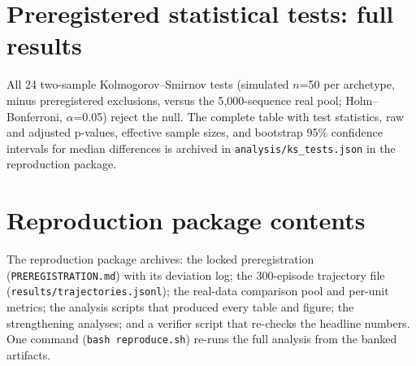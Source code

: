 \documentclass[12pt,a4paper]{article}
\begin{document}
\appendix

\section{Preregistered statistical tests: full results}

All 24 two-sample Kolmogorov--Smirnov tests (simulated $n$=50 per archetype,
minus preregistered exclusions, versus the 5{,}000-sequence real pool;
Holm--Bonferroni, $\alpha$=0.05) reject the null. The complete table with
test statistics, raw and adjusted p-values, effective sample sizes, and
bootstrap 95\% confidence intervals for median differences is archived in
\texttt{analysis/ks\_tests.json} in the reproduction package.

\section{Reproduction package contents}

The reproduction package archives: the locked preregistration
(\texttt{PREREGISTRATION.md}) with its deviation log; the 300-episode
trajectory file (\texttt{results/trajectories.jsonl}); the real-data
comparison pool and per-unit metrics; the analysis scripts that produced
every table and figure; the strengthening analyses; and a verifier script
that re-checks the headline numbers. One command (\texttt{bash
reproduce.sh}) re-runs the full analysis from the banked artifacts.
\end{document}

